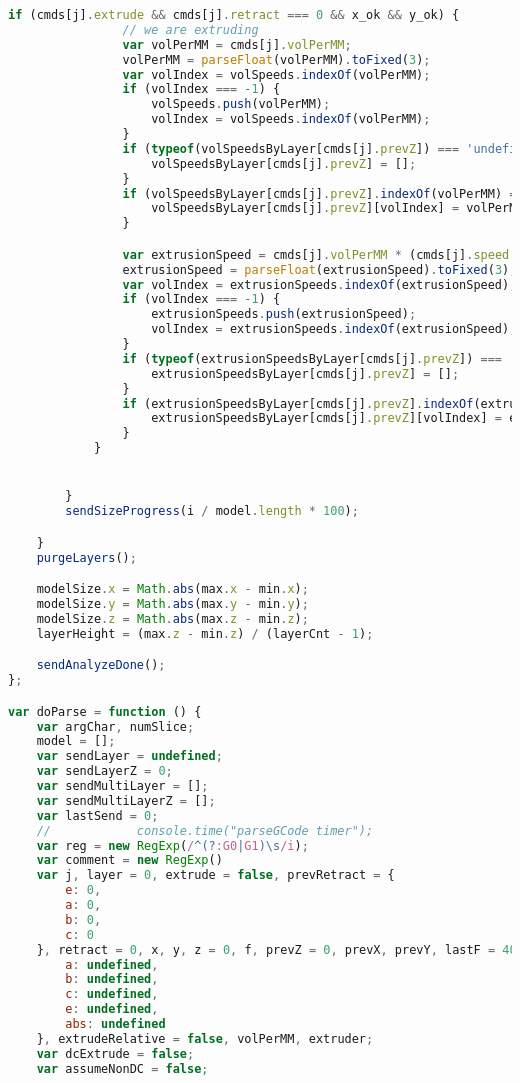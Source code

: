 \begin{lstlisting}[language=JavaScript, label={lst:Worker}, caption=Workerjs is the core gcode to D3 line processor.]
            if (cmds[j].extrude && cmds[j].retract === 0 && x_ok && y_ok) {
                // we are extruding
                var volPerMM = cmds[j].volPerMM;
                volPerMM = parseFloat(volPerMM).toFixed(3);
                var volIndex = volSpeeds.indexOf(volPerMM);
                if (volIndex === -1) {
                    volSpeeds.push(volPerMM);
                    volIndex = volSpeeds.indexOf(volPerMM);
                }
                if (typeof(volSpeedsByLayer[cmds[j].prevZ]) === 'undefined') {
                    volSpeedsByLayer[cmds[j].prevZ] = [];
                }
                if (volSpeedsByLayer[cmds[j].prevZ].indexOf(volPerMM) === -1) {
                    volSpeedsByLayer[cmds[j].prevZ][volIndex] = volPerMM;
                }

                var extrusionSpeed = cmds[j].volPerMM * (cmds[j].speed / 60);
                extrusionSpeed = parseFloat(extrusionSpeed).toFixed(3);
                var volIndex = extrusionSpeeds.indexOf(extrusionSpeed);
                if (volIndex === -1) {
                    extrusionSpeeds.push(extrusionSpeed);
                    volIndex = extrusionSpeeds.indexOf(extrusionSpeed);
                }
                if (typeof(extrusionSpeedsByLayer[cmds[j].prevZ]) === 'undefined') {
                    extrusionSpeedsByLayer[cmds[j].prevZ] = [];
                }
                if (extrusionSpeedsByLayer[cmds[j].prevZ].indexOf(extrusionSpeed) === -1) {
                    extrusionSpeedsByLayer[cmds[j].prevZ][volIndex] = extrusionSpeed;
                }
            }


        }
        sendSizeProgress(i / model.length * 100);

    }
    purgeLayers();

    modelSize.x = Math.abs(max.x - min.x);
    modelSize.y = Math.abs(max.y - min.y);
    modelSize.z = Math.abs(max.z - min.z);
    layerHeight = (max.z - min.z) / (layerCnt - 1);

    sendAnalyzeDone();
};

var doParse = function () {
    var argChar, numSlice;
    model = [];
    var sendLayer = undefined;
    var sendLayerZ = 0;
    var sendMultiLayer = [];
    var sendMultiLayerZ = [];
    var lastSend = 0;
    //            console.time("parseGCode timer");
    var reg = new RegExp(/^(?:G0|G1)\s/i);
    var comment = new RegExp()
    var j, layer = 0, extrude = false, prevRetract = {
        e: 0,
        a: 0,
        b: 0,
        c: 0
    }, retract = 0, x, y, z = 0, f, prevZ = 0, prevX, prevY, lastF = 4000, prev_extrude = {
        a: undefined,
        b: undefined,
        c: undefined,
        e: undefined,
        abs: undefined
    }, extrudeRelative = false, volPerMM, extruder;
    var dcExtrude = false;
    var assumeNonDC = false;


\end{lstlisting}
